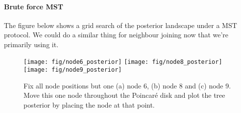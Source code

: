 \documentclass[11pt, twocolumn]{article}
\begin{document}
\paragraph{Brute force MST}
The figure below shows a grid search of the posterior landscape under a MST protocol.
We could do a similar thing for neighbour joining now that we're primarily using it.
\begin{figure}[htbp]
\begin{center}
\texttt{[image: fig/node6\_posterior]}%
\texttt{[image: fig/node8\_posterior]}%
\texttt{[image: fig/node9\_posterior]}
\end{center}
\caption{Fix all node positions but one (a) node 6, (b) node 8 and (c) node 9. Move this one node throughout the Poincaré disk and plot the tree posterior by placing the node at that point.}
\end{figure}
    
\end{document}
